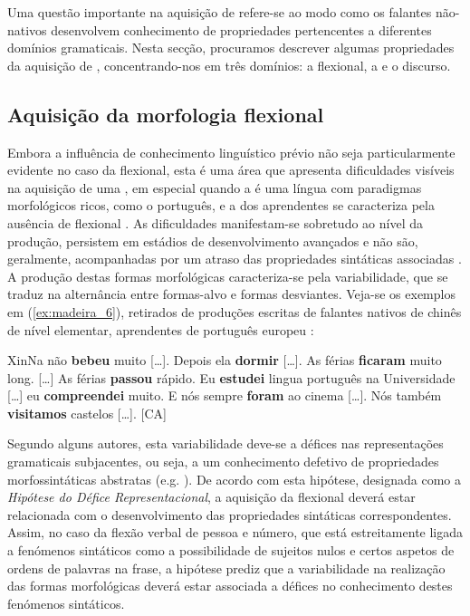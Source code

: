 \documentclass[output=paper]{LSP/langsci}
\begin{document}
Uma questão importante na aquisição de  refere-se ao modo como os falantes não-nativos desenvolvem conhecimento de propriedades pertencentes a diferentes domínios gramaticais. Nesta secção, procuramos descrever algumas propriedades da aquisição de , concentrando-nos em três domínios: a  flexional, a  e o discurso.  


\subsection{Aquisição da morfologia flexional}
\label{subsec:madeira_aquisicao_morfologia}
Embora a influência de conhecimento linguístico prévio não seja particularmente evidente no caso da  flexional, esta é uma área que apresenta dificuldades visíveis na aquisição de uma , em especial quando a  é uma língua com paradigmas morfológicos ricos, como o português, e a  dos aprendentes se caracteriza pela ausência de  flexional \citep{white2003}. As dificuldades manifestam-se sobretudo ao nível da produção, persistem em estádios de desenvolvimento avançados e não são, geralmente, acompanhadas por um atraso das propriedades sintáticas associadas \citep{lardiere2000,prevostwhite2000}. A produção destas formas morfológicas caracteriza-se pela variabilidade, que se traduz na alternância entre formas-alvo e formas desviantes. Veja-se os exemplos em (\ref{ex:madeira_6}), retirados de produções escritas de falantes nativos de chinês de nível elementar, aprendentes de português europeu :

\ea\label{ex:madeira_6}
\ea\label{ex:madeira_6a} XinNa não \textbf{bebeu} muito [\ldots]. Depois ela \textbf{dormir} [\ldots].
\ex\label{ex:madeira_6b} As férias \textbf{ficaram} muito long. [\ldots] As férias \textbf{passou} rápido.
\ex\label{ex:madeira_6c} Eu \textbf{estudei} lingua português na Universidade [\ldots] eu \textbf{compreendei} muito.
\ex\label{ex:madeira_6d} E nós sempre \textbf{foram} ao cinema [\ldots]. Nós também \textbf{visitamos} castelos [\ldots]. [CA]
\zl

Segundo alguns autores, esta variabilidade deve-se a défices nas representações gramaticais subjacentes, ou seja, a um conhecimento defetivo de propriedades morfossintáticas abstratas (e.g. \citealt{hawkinschan1997}). De acordo com esta hipótese, designada como a \textit{Hipótese do Défice Representacional}, a aquisição da  flexional deverá estar relacionada com o desenvolvimento das propriedades sintáticas correspondentes. Assim, no caso da flexão verbal de pessoa e número, que está estreitamente ligada a fenómenos sintáticos como a possibilidade de sujeitos nulos e certos aspetos de ordens de palavras na frase, a hipótese prediz que a variabilidade na realização das formas morfológicas deverá estar associada a défices no conhecimento destes fenómenos sintáticos. 
\end{document}
